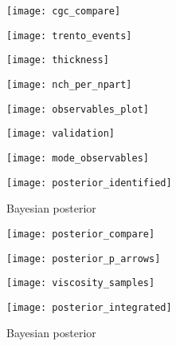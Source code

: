 \documentclass[aps,prc,reprint,amsmath]{revtex4-1}
\begin{document}
\begin{figure*}
    \texttt{[image: cgc\_compare]}
\end{figure*}

\begin{figure}
    \texttt{[image: trento\_events]}
\end{figure}

\begin{figure}[b]
    \texttt{[image: thickness]}
\end{figure}

\begin{figure}
    \texttt{[image: nch\_per\_npart]}
\end{figure}

\begin{figure*}
    \texttt{[image: observables\_plot]}
\end{figure*}

\begin{figure*}
    \texttt{[image: validation]}
\end{figure*}

\begin{figure*}
    \texttt{[image: mode\_observables]}
\end{figure*}

\begin{figure*}
    \texttt{[image: posterior\_identified]}
    \caption{Bayesian posterior}
\end{figure*}

\begin{figure*}
    \texttt{[image: posterior\_compare]}
\end{figure*}

\begin{figure}
    \centering
    \texttt{[image: posterior\_p\_arrows]}
\end{figure}

\begin{figure}
    \texttt{[image: viscosity\_samples]}
\end{figure}

\appendix
\begin{figure*}
    \texttt{[image: posterior\_integrated]}
    \caption{Bayesian posterior}
\end{figure*}


\end{document}
